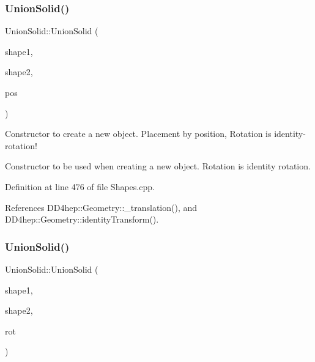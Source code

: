 \subsubsection{\texorpdfstring{Union\+Solid()}{UnionSolid()}\hspace{0.1cm}{\footnotesize\ttfamily [5/8]}}
{\footnotesize\ttfamily Union\+Solid\+::\+Union\+Solid (\begin{DoxyParamCaption}\item[{const \hyperlink{namespace_d_d4hep_1_1_geometry_a83de90a8dcc7378ba47d54ef9a6a687b}{Solid} \&}]{shape1,  }\item[{const \hyperlink{namespace_d_d4hep_1_1_geometry_a83de90a8dcc7378ba47d54ef9a6a687b}{Solid} \&}]{shape2,  }\item[{const \hyperlink{namespace_d_d4hep_1_1_geometry_a55083902099d03506c6db01b80404900}{Position} \&}]{pos }\end{DoxyParamCaption})}



Constructor to create a new object. Placement by position, Rotation is identity-\/rotation! 

Constructor to be used when creating a new object. Rotation is identity rotation. 

Definition at line 476 of file Shapes.\+cpp.



References D\+D4hep\+::\+Geometry\+::\+\_\+translation(), and D\+D4hep\+::\+Geometry\+::identity\+Transform().

\hypertarget{class_d_d4hep_1_1_geometry_1_1_union_solid_a7756c7183422cf3f33cee33b161389e0}{}\label{class_d_d4hep_1_1_geometry_1_1_union_solid_a7756c7183422cf3f33cee33b161389e0} 
\subsubsection{\texorpdfstring{Union\+Solid()}{UnionSolid()}\hspace{0.1cm}{\footnotesize\ttfamily [6/8]}}
{\footnotesize\ttfamily Union\+Solid\+::\+Union\+Solid (\begin{DoxyParamCaption}\item[{const \hyperlink{namespace_d_d4hep_1_1_geometry_a83de90a8dcc7378ba47d54ef9a6a687b}{Solid} \&}]{shape1,  }\item[{const \hyperlink{namespace_d_d4hep_1_1_geometry_a83de90a8dcc7378ba47d54ef9a6a687b}{Solid} \&}]{shape2,  }\item[{const \hyperlink{namespace_d_d4hep_1_1_geometry_a24667b2b9c3cec3d5239828db4d52189}{Rotation\+Z\+YX} \&}]{rot }\end{DoxyParamCaption})}



